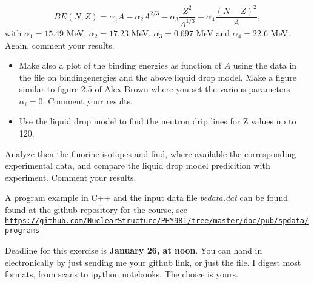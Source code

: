 \documentclass[%
twoside,                 %
final,                   %
10pt]{article}
\begin{document}
\noindent
\[
BE(N,Z)= \alpha_1A-\alpha_2A^{2/3}-\alpha_3\frac{Z^2}{A^{1/3}}-\alpha_4\frac{(N-Z)^2}{A},
\]
with $\alpha_1=15.49$ MeV, $\alpha_2=17.23$ MeV, $\alpha_3=0.697$ MeV and $\alpha_4=22.6$ MeV.
Again, comment your results. 
\begin{itemize}
 \item Make also a plot of the binding energies as function of $A$ using the data in the file on bindingenergies and the above liquid drop model.  Make a figure similar to figure 2.5 of Alex Brown where you set the various parameters $\alpha_i=0$. Comment your results. 

 \item Use the liquid drop model to find the neutron drip lines   for Z values up to 120.
\end{itemize}

\noindent
Analyze then the fluorine isotopes and find, where available the corresponding experimental data, and compare the liquid drop model predicition with experiment. 
Comment your results.

A program example in C++ and the input data file \emph{bedata.dat} can be found found at the github repository for the course, see \href{{https://github.com/NuclearStructure/PHY981/tree/master/doc/pub/spdata/programs}}{\nolinkurl{https://github.com/NuclearStructure/PHY981/tree/master/doc/pub/spdata/programs}}

Deadline for this exercise is \textbf{January 26, at noon}.  You can hand in electronically by just sending me your github link, or just the file. I digest most formats, from scans to ipython notebooks. The choice is yours.






\printindex
\end{document}

